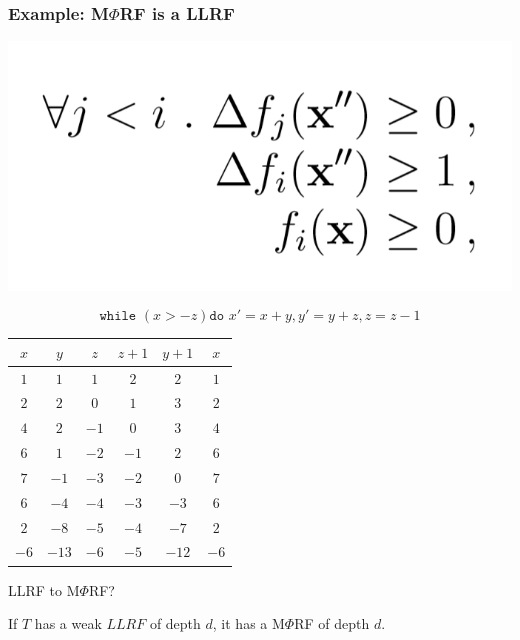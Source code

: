 \documentclass[11pt]{beamer}
\begin{document}
\begin{frame}\frametitle{Example: M$\Phi$RF is a LLRF}
\begin{center}
\includegraphics[scale = 0.2]{4.png}
\end{center}
\[\texttt{while }( x > -z) \texttt{do } x' = x + y, y' = y + z, z = z - 1\]

\begin{center}
\begin{tabular}{|c|c|c|c|c|c|}
\hline 
$x$&$y$&$z$&$z+1$&$y+1$&$x$\\
\hline
$1$&$1$&$1$&$2$&$2$&$1$\\
$2$&$2$&$0$&$1$&$3$&$2$\\
$4$&$2$&$-1$&$0$&$3$&$4$\\
\hline
$6$&$1$&$-2$&$-1$&$2$&$6$\\
$7$&$-1$&$-3$&$-2$&$0$&$7$\\
\hline
$6$&$-4$&$-4$&$-3$&$-3$&$6$\\
$2$&$-8$&$-5$&$-4$&$-7$&$2$\\
\hline
$-6$&$-13$&$-6$&$-5$&$-12$&$-6$\\
\hline
\end{tabular}
\end{center}

\end{frame}

\begin{frame}{LLRF to M$\Phi$RF?}
\begin{theorem}
If $T$ has a weak $LLRF$ of depth $d$, it has a M$\Phi$RF of depth $d$.

\end{theorem}

\end{frame}
\end{document}
